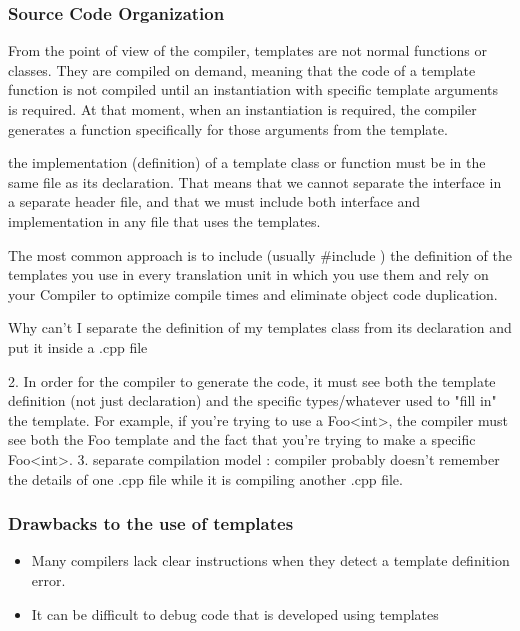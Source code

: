 \documentclass{beamer}
\begin{document}
\begin{frame}[fragile]
\frametitle{Source Code Organization}

From the point of view of the compiler, templates are not normal functions or classes. They are compiled on demand, meaning that the code of a template function is not compiled until an instantiation with specific template arguments is required. At that moment, when an instantiation is required, the compiler generates a function specifically for those arguments from the template.

the implementation (definition) of a template class or function must be in the same file as its declaration. That means that we cannot separate the interface in a separate header file, and that we must include both interface and implementation in any file that uses the templates.

The most common approach is to include (usually \#include ) the
definition of the templates you use in every translation unit in which you use them and rely on your
Compiler to optimize compile times and eliminate object code duplication.


Why can’t I separate the definition of my templates class from its declaration and put it inside a .cpp file

2. In order for the compiler to generate the code, it must see both the template definition (not just declaration) and the specific types/whatever used to "fill in" the template. For example, if you’re trying to use a Foo<int>, the compiler must see both the Foo template and the fact that you’re trying to make a specific Foo<int>.
3. separate compilation model :
   compiler probably doesn't remember the details of one .cpp file while it is compiling another .cpp file.

\end{frame}



\begin{frame}
\frametitle{Drawbacks to the use of templates}
\begin{itemize}
\item Many compilers lack clear instructions when they detect a template definition error.
\item It can be difficult to debug code that is developed using templates
\end{itemize}

\end{frame}

\end{document}
